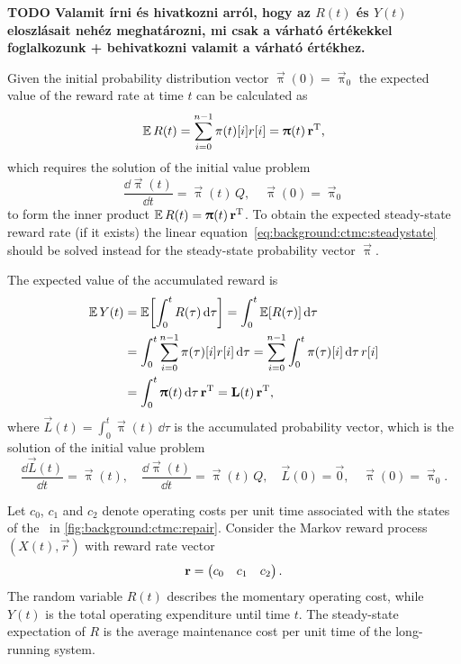 \textbf{TODO Valamit írni és hivatkozni arról, hogy az $R(t)$ és
  $Y(t)$ eloszlásait nehéz meghatározni, mi csak a várható értékekkel
  foglalkozunk + behivatkozni valamit a várható értékhez.}

Given the initial probability distribution vector
$\vec{\uppi}(0) = \vec{\uppi}_0$ the expected value of the reward rate
at time $t$ can be calculated as
\begin{equation}
  \label{eq:background:ctmc:reward}
  \Ex R(t) = \sum_{i = 0}^{n - 1} \pi(t)[i] r[i] = \vec{\uppi}(t)
  \, \vec{r}^\T \text,
\end{equation}
which requires the solution of the initial value problem%
~\citep{DBLP:journals/cor/Grassmann77,reibman1989markov}
\begin{equation}
  \frac{\dd \vec{\uppi}(t)}{\dd t} = \vec{\uppi}(t) \, Q, \quad
  \vec{\uppi}(0) = \vec{\uppi}_0
\end{equation}
to form the inner product $\Ex R(t) = \vec{\uppi}(t) \, \vec{r}^\T$.
To obtain the expected steady-state reward rate (if it exists) the
linear equation~\eqref{eq:background:ctmc:steadystate} should be
solved instead for the steady-state probability vector $\vec{\uppi}$.

The expected value of the accumulated reward is
\begin{align}
  \Ex Y(t) &= \Ex\mleft[ \int_0^t R(\tau) \,\dd\tau \mright] =
             \int_0^t \Ex[R(\tau)] \,\dd\tau \\
           &= \int_0^t \sum_{i = 0}^{n - 1} \pi(\tau)[i] r[i]
             \,\dd\tau = \sum_{i = 0}^{n - 1} \int_0^t \pi(\tau)[i]
             \,\dd\tau \, r[i] \\
           &= \int_0^t \vec{\uppi}(t) \,\dd\tau \, \vec{r}^\T =
             \vec{L}(t) \, \vec{r}^\T \text,
\end{align}
where $\vec{L}(t) = \int_0^t \vec{\uppi}(t) \,\dd\tau$ is the accumulated
probability vector, which is the solution of the initial value
problem~\citep{reibman1989markov}
\begin{equation}
  \frac{\dd \vec{L}(t)}{\dd t} = \vec{\uppi}(t), \quad \frac{\dd
    \vec{\uppi}(t)}{\dd t} = \vec{\uppi}(t) \, Q, \quad
  \vec{L}(0) = \vec{0}, \quad \vec{\uppi}(0) = \vec{\uppi}_0.
\end{equation}

\begin{example}
  Let $c_0$, $c_1$ and $c_2$ denote operating costs per unit time
  associated with the states of the \CTMC\ in
  \cref{fig:background:ctmc:repair}. Consider the Markov reward
  process $(X(t), \vec{r})$ with reward rate vector
  \begin{equation}
    \vec{r} = \begin{pmatrix} c_0 & c_1 & c_2 \end{pmatrix} \text.
  \end{equation}
  The random variable $R(t)$ describes the momentary operating cost,
  while $Y(t)$ is the total operating expenditure until time $t$. The
  steady-state expectation of $R$ is the average maintenance cost per
  unit time of the long-running system.
\end{example}

